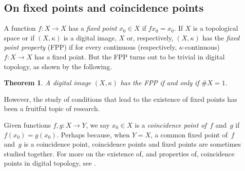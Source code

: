 \documentclass{article}
\newtheorem{thm}{Theorem}
\numberwithin{thm}{section}
\begin{document}

\subsection{On fixed points and coincidence 
points}
A function $f: X \to X$ has a {\em fixed point} $x_0 \in X$ if
$fx_0 = x_0$. If $X$ is a topological space or if $(X,\kappa)$ is
a digital image, $X$ or, respectively, $(X,\kappa)$ has the
{\em fixed point property} (FPP) if for every continuous
(respectively, $\kappa$-continuous) $f: X \to X$ has a fixed point.
But the FPP turns out to be trivial in digital topology, as shown by the following.

\begin{thm}
\label{BEKLLthm}
    {\rm \cite{BEKLL}} A digital image $(X,\kappa)$ has the FPP if
    and only if $\#X = 1$.
\end{thm}

However, the study of conditions that 
lead to the existence of fixed points 
has been a fruitful topic of research.

Given functions $f,g: X \to Y$, we say
$x_0 \in X$ is a {\em coincidence point 
of}~$f$ and~$g$ if $f(x_0) = g(x_0)$.
Perhaps because, when $Y=X$, a common fixed point
of~$f$ and~$g$ is a coincidence point,
coincidence points and fixed points are
sometimes studied together.
For more on the existence of,
and properties of, coincidence points 
in digital topology, see \cite{AbdullahiEtal20}.
\end{document}
